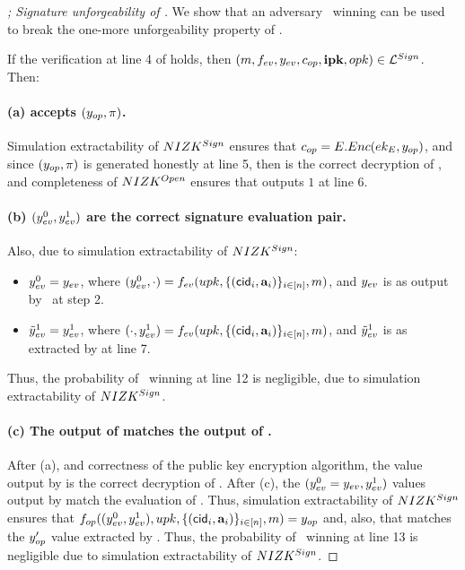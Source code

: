 \begin{proof}[; Signature unforgeability of \CUASGen]
  We show that an adversary \adv~winning \ExpForgeSign can be used to break the
  one-more unforgeability property of \SBCM.
 
  If the verification at line 4 of \ExpForgeSign holds, then $(m,f_{ev},
  y_{ev},c_{op},\mathbf{ipk},opk) \in \mathcal{L}^{Sign}$. Then:

  \paragraph{(a) \Judge accepts $(y_{op},\pi)$.} %
  Simulation extractability of $NIZK^{Sign}$ ensures that $c_{op} =
  E.Enc(ek_{E},y_{op})$, and since $(y_{op},\pi)$ is generated honestly at
  line 5, then \yinsp is the correct decryption of \cinsp, and completeness of
  $NIZK^{Open}$ ensures that \Judge outputs $1$ at line 6.

  \paragraph{(b) $(y_{ev}^0,y_{ev}^1)$ are the correct signature evaluation
    pair.} Also, due to simulation extractability of $NIZK^{Sign}$:

  \begin{itemize}
  \item $y_{ev}^0 = y_{ev}$, where $(y_{ev}^0,\cdot) = f_{ev}(upk,\lbrace
    (\mathsf{cid}_i,\mathbf{a}_i) \rbrace_{i\in[n]},m)$, and $y_{ev}$ is as output by
    \adv~at step 2.    
  \item $\tilde{y}_{ev}^1 = y_{ev}^1$, where $(\cdot,y_{ev}^1) = f_{ev}(upk,\lbrace
    (\mathsf{cid}_i,\mathbf{a}_i)\rbrace_{i\in[n]},m)$, and $\tilde{y}_{ev}^1$ is as extracted
    by \ExtractSign at line 7.
  \end{itemize}

  Thus, the probability of \adv~winning at line 12 is negligible, due to
  simulation extractability of $NIZK^{Sign}$.

  \paragraph{(c) The output of \finsp matches the output of \Open.} %
  After (a), and correctness of the public key encryption algorithm, the \yinsp
  value output by \Open is the correct decryption of
  \cinsp. After (c), the $(y_{ev}^0=y_{ev},y_{ev}^1)$ values output by
  \ExtractSign match the evaluation of \feval. Thus, simulation extractability
  of $NIZK^{Sign}$ ensures that $f_{op}((y_{ev}^0,y_{ev}^1),upk,\lbrace
  (\mathsf{cid}_i,\mathbf{a}_i)\rbrace_{i\in[n]},m) = y_{op}$ and, also, that \yinsp
  matches the $y_{op}'$ value extracted by \ExtractSign. Thus, the probability
  of \adv~winning at line 13 is negligible due to simulation extractability
  of $NIZK^{Sign}$.


\end{proof}
